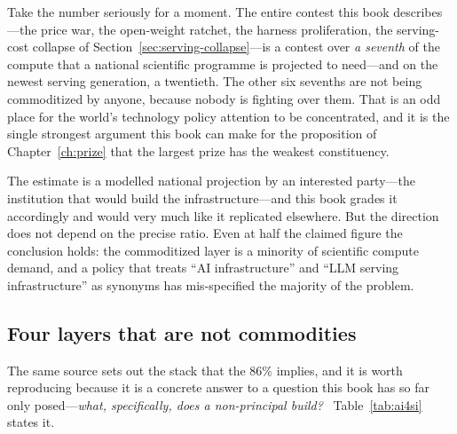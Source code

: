 Take the number seriously for a moment. The entire contest this book describes---the price war, the open-weight ratchet, the harness proliferation, the serving-cost collapse of Section~\ref{sec:serving-collapse}---is a contest over \emph{a seventh} of the compute that a national scientific programme is projected to need---and on the newest serving generation, a twentieth. The other six sevenths are not being commoditized by anyone, because nobody is fighting over them. That is an odd place for the world's technology policy attention to be concentrated, and it is the single strongest argument this book can make for the proposition of Chapter~\ref{ch:prize} that the largest prize has the weakest constituency.

The estimate is a modelled national projection by an interested party---the institution that would build the infrastructure---and this book grades it accordingly and would very much like it replicated elsewhere. But the direction does not depend on the precise ratio. Even at half the claimed figure the conclusion holds: the commoditized layer is a minority of scientific compute demand, and a policy that treats ``AI infrastructure'' and ``LLM serving infrastructure'' as synonyms has mis-specified the majority of the problem.

\subsection{Four layers that are not commodities}

The same source sets out the stack that the 86\% implies, and it is worth reproducing because it is a concrete answer to a question this book has so far only posed---\emph{what, specifically, does a non-principal build?}~\cite{ai4si-stack} Table~\ref{tab:ai4si} states it.

